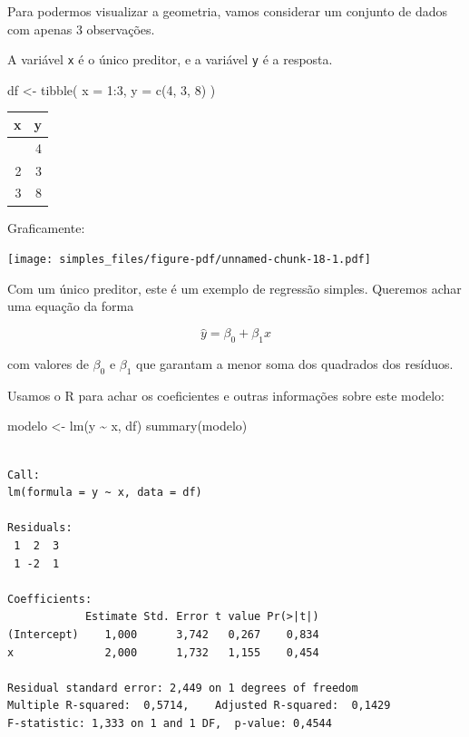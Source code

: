 \documentclass[
  letterpaper,
  DIV=11,
  numbers=noendperiod]{scrreprt}
\newenvironment{Shaded}{\begin{snugshade}}{\end{snugshade}}
\newcommand{\AttributeTok}[1]{\textcolor[rgb]{0.40,0.45,0.13}{#1}}
\newcommand{\DecValTok}[1]{\textcolor[rgb]{0.68,0.00,0.00}{#1}}
\newcommand{\FunctionTok}[1]{\textcolor[rgb]{0.28,0.35,0.67}{#1}}
\newcommand{\NormalTok}[1]{\textcolor[rgb]{0.00,0.23,0.31}{#1}}
\newcommand{\OtherTok}[1]{\textcolor[rgb]{0.00,0.23,0.31}{#1}}
\newcommand{\SpecialCharTok}[1]{\textcolor[rgb]{0.37,0.37,0.37}{#1}}
\begin{document}
Para podermos visualizar a geometria, vamos considerar um conjunto de
dados com apenas $3$ observações.

A variável \texttt{x} é o único preditor, e a variável \texttt{y} é a
resposta.

\begin{Shaded}
\begin{Highlighting}[]
\NormalTok{df }\OtherTok{\textless{}{-}} \FunctionTok{tibble}\NormalTok{(}
  \AttributeTok{x =} \DecValTok{1}\SpecialCharTok{:}\DecValTok{3}\NormalTok{,}
  \AttributeTok{y =} \FunctionTok{c}\NormalTok{(}\DecValTok{4}\NormalTok{, }\DecValTok{3}\NormalTok{, }\DecValTok{8}\NormalTok{)}
\NormalTok{)}
\end{Highlighting}
\end{Shaded}

\begin{longtable*}{rr}
\toprule
x & y \\ 
\midrule{} & 4 \\ 
2 & 3 \\ 
3 & 8 \\ 
\bottomrule
\end{longtable*}

Graficamente:

\begin{center}
\texttt{[image: simples\_files/figure-pdf/unnamed-chunk-18-1.pdf]}
\end{center}

Com um único preditor, este é um exemplo de regressão simples. Queremos
achar uma equação da forma

\[
\hat y = \beta_0 + \beta_1x
\]

com valores de $\beta_0$ e $\beta_1$ que garantam a menor soma dos
quadrados dos resíduos.

Usamos o R para achar os coeficientes e outras informações sobre este
modelo:

\begin{Shaded}
\begin{Highlighting}[]
\NormalTok{modelo }\OtherTok{\textless{}{-}} \FunctionTok{lm}\NormalTok{(y }\SpecialCharTok{\textasciitilde{}}\NormalTok{ x, df)}
\FunctionTok{summary}\NormalTok{(modelo)}
\end{Highlighting}
\end{Shaded}

\begin{verbatim}

Call:
lm(formula = y ~ x, data = df)

Residuals:
 1  2  3 
 1 -2  1 

Coefficients:
            Estimate Std. Error t value Pr(>|t|)
(Intercept)    1,000      3,742   0,267    0,834
x              2,000      1,732   1,155    0,454

Residual standard error: 2,449 on 1 degrees of freedom
Multiple R-squared:  0,5714,    Adjusted R-squared:  0,1429 
F-statistic: 1,333 on 1 and 1 DF,  p-value: 0,4544
\end{verbatim}
\end{document}
